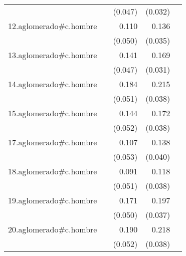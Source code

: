 {\begin{longtable}{l*{4}{D{.}{.}{-1}}}
            &                     &     (0.047)         &     (0.032)         &                     \\
\addlinespace
12.aglomerado#c.hombre&                     &       0.110\sym{*}  &       0.136\sym{***}&                     \\
            &                     &     (0.050)         &     (0.035)         &                     \\
\addlinespace
13.aglomerado#c.hombre&                     &       0.141\sym{**} &       0.169\sym{***}&                     \\
            &                     &     (0.047)         &     (0.031)         &                     \\
\addlinespace
14.aglomerado#c.hombre&                     &       0.184\sym{***}&       0.215\sym{***}&                     \\
            &                     &     (0.051)         &     (0.038)         &                     \\
\addlinespace
15.aglomerado#c.hombre&                     &       0.144\sym{**} &       0.172\sym{***}&                     \\
            &                     &     (0.052)         &     (0.038)         &                     \\
\addlinespace
17.aglomerado#c.hombre&                     &       0.107\sym{*}  &       0.138\sym{***}&                     \\
            &                     &     (0.053)         &     (0.040)         &                     \\
\addlinespace
18.aglomerado#c.hombre&                     &       0.091         &       0.118\sym{**} &                     \\
            &                     &     (0.051)         &     (0.038)         &                     \\
\addlinespace
19.aglomerado#c.hombre&                     &       0.171\sym{***}&       0.197\sym{***}&                     \\
            &                     &     (0.050)         &     (0.037)         &                     \\
\addlinespace
20.aglomerado#c.hombre&                     &       0.190\sym{***}&       0.218\sym{***}&                     \\
            &                     &     (0.052)         &     (0.038)         &                     \\

\end{longtable}}
